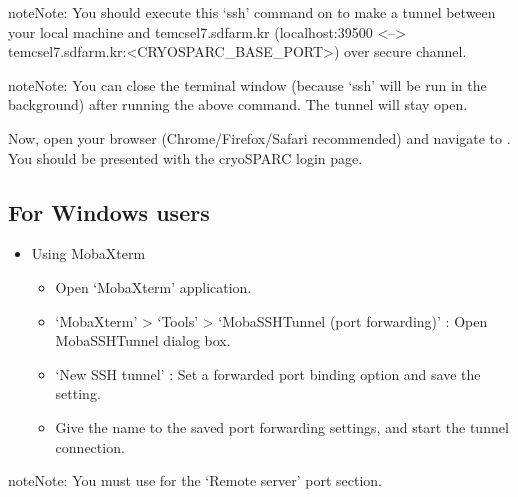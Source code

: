 \documentclass[a4paper,10pt,english]{sphinxmanual}
\begin{document}
\begin{sphinxadmonition}{note}{Note:}
\sphinxAtStartPar
You should execute this ‘ssh’ command on  to make a tunnel between
your local machine and tem\sphinxhyphen{}cs\sphinxhyphen{}el7.sdfarm.kr (localhost:39500 <–> tem\sphinxhyphen{}cs\sphinxhyphen{}el7.sdfarm.kr:<CRYOSPARC\_BASE\_PORT>) over secure channel.
\end{sphinxadmonition}

\begin{sphinxadmonition}{note}{Note:}
\sphinxAtStartPar
You can close the terminal window (because ‘ssh’ will be run in the background) after running the above command. The tunnel will stay open.
\end{sphinxadmonition}

\sphinxAtStartPar
Now, open your browser (Chrome/Firefox/Safari recommended) and navigate to . You should be presented with the cryoSPARC login page.


\subsection{For Windows users}
\label{\detokenize{cryoSPARC:for-windows-users}}\begin{itemize}
\item {} 
\sphinxAtStartPar
Using MobaXterm
\begin{itemize}
\item {} 
\sphinxAtStartPar
Open ‘MobaXterm’ application.

\item {} 
\sphinxAtStartPar
‘MobaXterm’ \sphinxhyphen{}> ‘Tools’ \sphinxhyphen{}> ‘MobaSSHTunnel (port forwarding)’ : Open MobaSSHTunnel dialog box.

\item {} 
\sphinxAtStartPar
‘New SSH tunnel’ : Set a forwarded port binding option and save the setting.

\item {} 
\sphinxAtStartPar
Give the name to the saved port forwarding settings, and start the tunnel connection.

\end{itemize}

\end{itemize}

\begin{sphinxadmonition}{note}{Note:}
\sphinxAtStartPar
You must use  for the ‘Remote server’ port section.
\end{sphinxadmonition}
\end{document}
